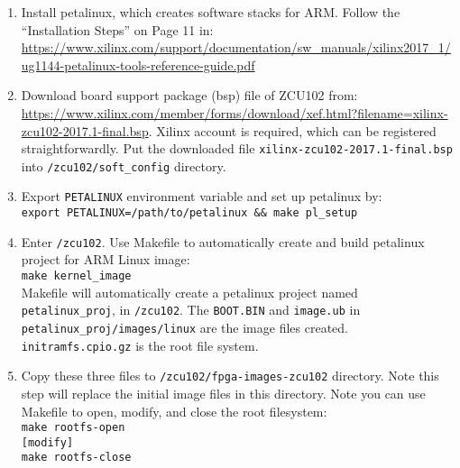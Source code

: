 \documentclass[a4paper,11pt]{article}
\begin{document}
\begin{enumerate}
\item Install petalinux, which creates software stacks for ARM. Follow the ``Installation Steps'' on Page 11 in: \url{https://www.xilinx.com/support/documentation/sw_manuals/xilinx2017_1/ug1144-petalinux-tools-reference-guide.pdf}

\item Download board support package (bsp) file of ZCU102 from: \url{https://www.xilinx.com/member/forms/download/xef.html?filename=xilinx-zcu102-2017.1-final.bsp}. Xilinx account is required, which can be registered straightforwardly. Put the downloaded file {\tt xilinx-zcu102-2017.1-final.bsp} into {\tt \rootdir/zcu102/soft\_config} directory.


\item Export {\tt PETALINUX} environment variable and set up petalinux by:\\
{\tt export PETALINUX=/path/to/petalinux \&\& make pl\_setup}

\item Enter {\tt \rootdir/zcu102}. Use Makefile to automatically create and build petalinux project for ARM Linux image:\\
{\tt make kernel\_image}\\
Makefile will automatically create a petalinux project named {\tt petalinux\_proj}, in {\tt \rootdir/zcu102}.
The {\tt BOOT.BIN} and {\tt image.ub} in {\tt petalinux\_proj/images/linux} are the image files created. {\tt initramfs.cpio.gz} is the root file system.

\item Copy these three files to {\tt \rootdir/zcu102/fpga-images-zcu102} directory. Note this step will replace the initial image files in this directory. Note you can use Makefile to open, modify, and close the root filesystem:\\
{\tt make rootfs-open}\\
{\tt [modify]}\\
{\tt make rootfs-close}
\end{enumerate}
\end{document}
